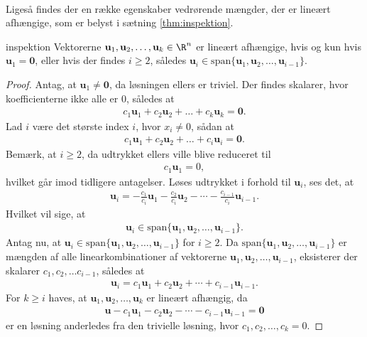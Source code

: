 \\
%
%
Ligeså findes der en række egenskaber vedrørende mængder, der er lineært afhængige, som er belyst i sætning \ref{thm:inspektion}.
%
%
\begin{thm}{}{inspektion}
%
Vektorerne $\mathbf{u}_1,\mathbf{u}_2, \ldots ,\mathbf{u}_k \in\R^n$ er lineært afhængige, 
hvis og kun hvis $\mathbf{u}_1=\mathbf{0}$, eller hvis der findes $i \geq 2$, således $\mathbf{u}_i \in \text{span} \{ \mathbf{u}_1,\mathbf{u}_2, \ldots ,\mathbf{u}_{i-1} \}$.
%
\end{thm}
%
%
\begin{proof}
% 
Antag, at $\mathbf{u}_1 \neq \mathbf{0}$, da løsningen ellers er triviel. 
Der findes skalarer, hvor koefficienterne ikke alle er $0$, således at
% 
\begin{align*}
c_1 \mathbf{u}_1 + c_2 \mathbf{u}_2 + \ldots + c_k \mathbf{u}_k = \mathbf{0}.
\end{align*}
%
Lad $i$ være det største index $i$, hvor $x_i \neq 0$, sådan at 
\begin{align*}
c_1 \mathbf{u}_1 + c_2 \mathbf{u}_2 + \ldots + c_i \mathbf{u}_i = \mathbf{0}.
\end{align*}
Bemærk, at $i\geq2$, da udtrykket ellers ville blive reduceret til
%
\begin{align*}
c_1\textbf{u}_1=0,
\end{align*}
%
hvilket går imod tidligere antagelser.
Løses udtrykket i forhold til $\mathbf{u}_i$, ses det, at
\begin{align*}
\mathbf{u}_i = - \frac{c_1}{c_i} \mathbf{u}_1 - \frac{c_2}{c_i} \mathbf{u}_2 - \cdots - \frac{c_{i-1}}{c_i} \mathbf{u}_{i-1}.
\end{align*}
Hvilket vil sige, at 
\begin{align*}
\mathbf{u}_i \in \text{span}\{ \mathbf{u}_1,\mathbf{u}_2, \ldots ,\mathbf{u}_{i-1} \}.
\end{align*}
%
Antag nu, at $\mathbf{u}_i \in \text{span}\{ \mathbf{u}_1,\mathbf{u}_2, \ldots ,\mathbf{u}_{i-1} \}$ for $i \geq 2$.
Da $\text{span}\{ \mathbf{u}_1,\mathbf{u}_2, \ldots ,\mathbf{u}_{i-1} \}$ er mængden af alle linearkombinationer af vektorerne $\mathbf{u}_1,\mathbf{u}_2, \ldots ,\mathbf{u}_{i-1}$, eksisterer der skalarer $c_1, c_2, \ldots c_{i-1}$, således at
%
\begin{align*}
\textbf{u}_i=c_1\mathbf{u}_1 + c_2 \mathbf{u}_2 + \cdots + c_{i-1}\mathbf{u}_{i-1}.
\end{align*}
%
For $k \geq i$ haves, at $\mathbf{u}_1,\mathbf{u}_2, \ldots ,\mathbf{u}_k$ er lineært afhængig, da 
\begin{align*}
\textbf{u} -c_1\textbf{u}_1 - c_2\textbf{u}_2 - \cdots - c_{i-1}\textbf{u}_{i-1} = \textbf{0}
\end{align*} 
er en løsning anderledes fra den trivielle løsning, hvor $c_1, c_2,\ldots,c_k=0$.
%
\end{proof}

